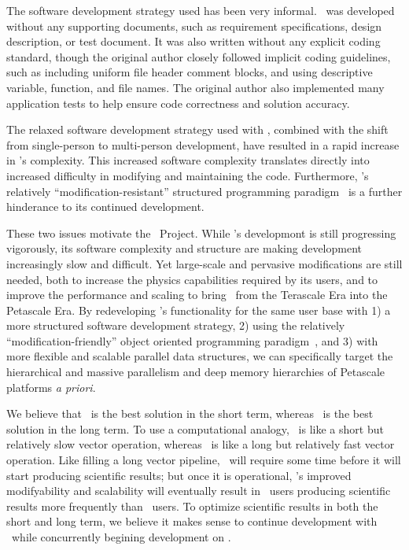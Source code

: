 \documentclass[11pt]{article}
\begin{document}
    The software development strategy used has been very informal.
    \enzo\ was developed without any supporting documents, such as
    requirement specifications, design description, or test document.
    It was also written without any explicit coding standard, though
    the original author closely followed implicit coding guidelines,
    such as including uniform file header comment blocks, and using
    descriptive variable, function, and file names.  The original
    author also implemented many application tests to help ensure
    code correctness and solution accuracy.  

    The relaxed software development strategy used with \enzo,
    combined with the shift from single-person to multi-person
    development, have resulted in a rapid increase in \enzo's
    complexity.  This increased software complexity translates
    directly into increased difficulty in modifying and maintaining
    the code.  Furthermore, \enzo's relatively
    ``modification-resistant'' structured programming
    paradigm~\cite{@@@} is a further hinderance to its continued
    development.
    


    These two issues motivate the \cello\ Project.  While \enzo's
    developmont is still progressing vigorously, its software
    complexity and structure are making development increasingly slow
    and difficult.  Yet large-scale and pervasive modifications are
    still needed, both to increase the physics capabilities required
    by its users, and to improve the performance and scaling to bring
    \enzo\ from the Terascale Era into the Petascale Era.  By
    redeveloping \enzo's functionality for the same user base with 1)
    a more structured software development strategy, 2) using the
    relatively ``modification-friendly'' object oriented programming
    paradigm~\cite{@@@}, and 3) with more flexible and scalable
    parallel data structures, we can specifically target the hierarchical and
    massive parallelism and deep memory hierarchies of Petascale
    platforms \textit{a priori}.


    We believe that \enzo\ is the best solution in the short term,
    whereas \cello\ is the best solution in the long term.  To use a
    computational analogy, \enzo\ is like a short but relatively slow
    vector operation, whereas \cello\ is like a long but relatively
    fast vector operation.  Like filling a long vector pipeline,
    \cello\ will require some time before it will start producing
    scientific results; but once it is operational, \cello's improved
    modifyability and scalability will eventually result in \cello\
    users producing scientific results more frequently than \enzo\
    users.  To optimize scientific results in both the short and long
    term, we believe it makes sense to continue development with
    \enzo\ while concurrently begining development on \cello.
  
\end{document}

